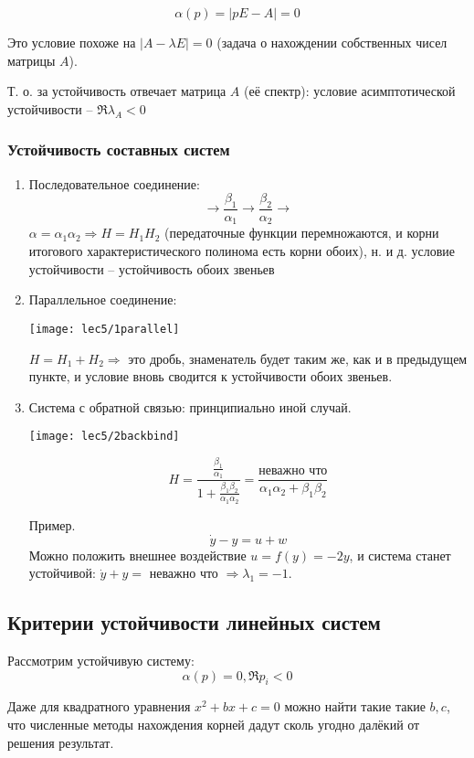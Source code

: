 \documentclass[main.tex]{subfiles}
\begin{document}
$$ \alpha(p) = |pE - A| = 0 $$

Это условие похоже на $ |A - \lambda E| = 0 $ (задача о нахождении собственных чисел матрицы $ A $).

Т. о. за устойчивость отвечает матрица $ A $ (её спектр): условие асимптотической устойчивости -- $ \boxed{ \Re \lambda_A < 0 } $

\subsubsection{Устойчивость составных систем}

\begin{enumerate}[noitemsep]
	\item Последовательное соединение:
     $$ \rightarrow \boxed{\frac{\beta_1}{\alpha_1}} \rightarrow \boxed{\frac{\beta_2}{\alpha_2}} \rightarrow $$
     $\alpha = \alpha_1 \alpha_2 \Rightarrow H = H_1 H_2$ (передаточные функции перемножаются, и корни итогового характеристического полинома есть корни обоих), н. и д. условие устойчивости -- устойчивость обоих звеньев
	\item Параллельное соединение:

          \texttt{[image: lec5/1parallel]}

     $ H = H_1 + H_2 \Rightarrow $ это дробь, знаменатель будет таким же, как и в предыдущем пункте, и условие вновь сводится к устойчивости обоих звеньев.
	\item Система с обратной связью: принципиально иной случай.

    \texttt{[image: lec5/2backbind]}

    $$ H = \frac{\frac{\beta_1}{\alpha_1}}{1 +  \frac{\beta_1 \beta_2}{\alpha_1 \alpha_2}} = \frac{\text{неважно что}}{\alpha_1 \alpha_2 + \beta_1 \beta_2} $$

    Пример.
    $$ \dot y - y = u + w $$
    Можно положить внешнее воздействие $ u = f(y) = -2y $, и система станет устойчивой: $ \dot y + y = \text{ неважно что } \Rightarrow \lambda_1 = -1 $.
\end{enumerate}

\subsection{ Критерии устойчивости линейных систем }
Рассмотрим устойчивую систему:
$$ \alpha(p) = 0, \Re p_i < 0 $$

Даже для квадратного уравнения $ x^2 + bx + c = 0 $ можно найти такие такие $b,c$, что численные методы нахождения корней дадут сколь угодно далёкий от решения результат.
\end{document}

